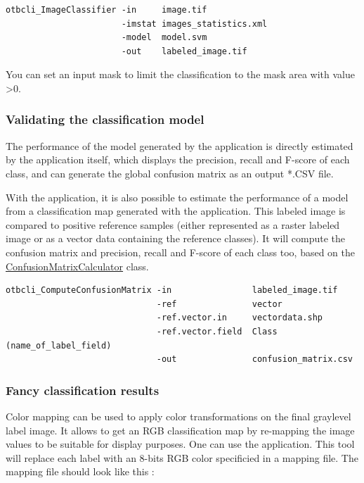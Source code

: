 \begin{verbatim}
otbcli_ImageClassifier -in     image.tif
                       -imstat images_statistics.xml
                       -model  model.svm
                       -out    labeled_image.tif
\end{verbatim}

You can set an input mask to limit the classification to the mask area with
value \textgreater 0.


\subsubsection{Validating the classification model}
The performance of the model generated by the  
application is directly estimated by the application itself, which displays the 
precision, recall and F-score of each class, and can generate the global confusion 
matrix as an output *.CSV file.
 
With the  application, it is also possible to 
estimate the performance of a model from a classification map generated with the 
 application. 
This labeled image is compared to positive reference samples (either represented as 
a raster labeled image or as a vector data containing the reference classes). It 
will compute the confusion matrix and precision, recall and F-score of each class 
too, based on the 
\href{http://www.orfeo-toolbox.org/doxygen-current/classotb_1_1ConfusionMatrixCalculator.html}{ConfusionMatrixCalculator} 
class.

\begin{verbatim}
otbcli_ComputeConfusionMatrix -in                labeled_image.tif
                              -ref               vector
                              -ref.vector.in     vectordata.shp
                              -ref.vector.field  Class (name_of_label_field)
                              -out               confusion_matrix.csv
\end{verbatim}



\subsubsection{Fancy classification results}
\label{ssec:classificationcolormapping}
Color mapping can be used to apply color transformations on the final
graylevel label image. It allows to get an RGB classification map
by re-mapping the image values to be suitable for display purposes.
One can use the  application. This tool will
replace each label with an 8-bits RGB color specificied in a mapping
file. The mapping file should look like this :

